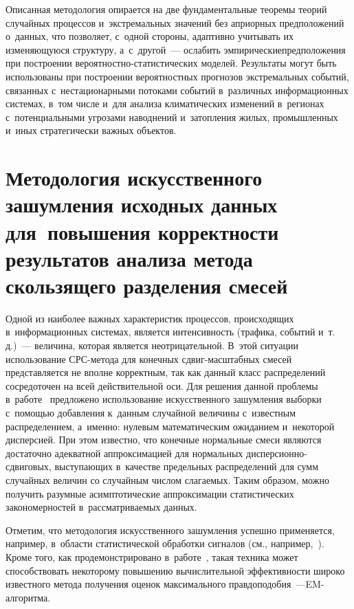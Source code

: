 \begin{multicols}{2}
Описанная методология опирается на две фундаментальные теоремы теорий 
случайных про\-цессов и~экстремальных значений без априорных предположе\-ний о~данных, 
что позволяет, с~одной стороны, адаптивно учитывать их из\-ме\-ня\-ющу\-юся структуру, 
а~с~другой~--- ослабить эмпирические\linebreak предположения при построении 
ве\-ро\-ят\-ност\-но-стати\-сти\-че\-ских моделей. Результаты могут быть 
использованы при построении вероятностных прогно\-зов экстремальных событий, 
связанных с~нестационарными потоками событий в~различных информационных сис\-те\-мах, 
в~том числе и~для анализа климатических изменений в~регионах с~потенциальными 
угрозами наводнений и~затопления жилых, промышленных и~иных стратегически важных 
объектов.

\section{Методология искусственного зашумления исходных данных 
для~повышения корректности результатов анализа метода скользящего
разделения смесей}

Одной из наиболее важных характеристик процессов, происходящих в~информационных 
сис\-те\-мах, является интенсивность (трафика, событий и~т.\,д.)~--- 
величина, которая является неотрицательной. В~этой ситуации использование СРС-ме\-то\-да 
для конечных сдвиг-мас\-штаб\-ных смесей пред\-став\-ля\-ет\-ся не вполне корректным, так 
как данный класс распределений сосредоточен на всей действительной оси. 
Для решения данной проблемы в~работе~\cite{Gorshenin2016CCIS2} предложено 
использование искусственного зашумления выборки с~по\-мощью добавления к~данным 
случайной величины с~известным распределением, а~именно: нулевым 
математическим ожиданием и~некоторой дисперсией. При этом известно, 
что конечные нормальные смеси являются достаточно адекватной аппроксимацией 
для нормальных дис\-пер\-си\-он\-но-сдви\-го\-вых, выступающих в~качестве 
предельных распределений для сумм случайных величин со случайным числом слагаемых. 
Таким образом, можно получить разумные асимптотические аппроксимации статистических 
закономерностей в~рассматриваемых данных.

Отметим, что методология искусственного зашумления успешно
применяется, напри\-мер, в~области статистической 
обработки сигналов (см., 
например,~\cite{Brey1996,Kosko2003}). Кроме того, как продемонстрировано 
в~работе~\cite{Osoba2013}, такая техника может способствовать некоторому 
повышению вычислительной эффективности широко известного метода полу\-чения 
оценок максимального правдоподобия~---\linebreak EM-ал\-го\-ритма.


\end{multicols}
